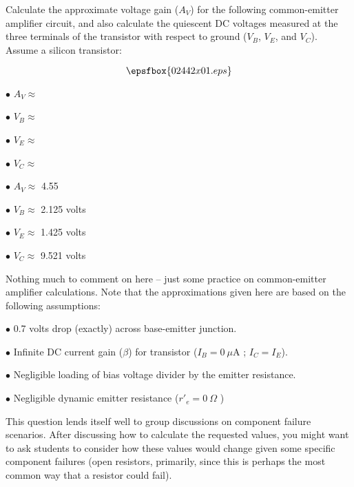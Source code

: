 

Calculate the approximate voltage gain ($A_V$) for the following common-emitter amplifier circuit, and also calculate the quiescent DC voltages measured at the three terminals of the transistor with respect to ground ($V_B$, $V_E$, and $V_C$).  Assume a silicon transistor:

$$\epsfbox{02442x01.eps}$$

\medskip
\goodbreak
\item{$\bullet$} $A_V \approx$ 
\item{$\bullet$} $V_B \approx$  
\item{$\bullet$} $V_E \approx$ 
\item{$\bullet$} $V_C \approx$ 
\medskip







\medskip
\goodbreak
\item{$\bullet$} $A_V \approx$ 4.55
\item{$\bullet$} $V_B \approx$ 2.125 volts
\item{$\bullet$} $V_E \approx$ 1.425 volts
\item{$\bullet$} $V_C \approx$ 9.521 volts
\medskip







Nothing much to comment on here -- just some practice on common-emitter amplifier calculations.  Note that the approximations given here are based on the following assumptions:

\medskip
\goodbreak
\item{$\bullet$} 0.7 volts drop (exactly) across base-emitter junction.
\item{$\bullet$} Infinite DC current gain ($\beta$) for transistor ($I_B = 0 \> \mu$A ; $I_C = I_E$).
\item{$\bullet$} Negligible loading of bias voltage divider by the emitter resistance.
\item{$\bullet$} Negligible dynamic emitter resistance ($r'_e = 0 \> \Omega$ )
\medskip

This question lends itself well to group discussions on component failure scenarios.  After discussing how to calculate the requested values, you might want to ask students to consider how these values would change given some specific component failures (open resistors, primarily, since this is perhaps the most common way that a resistor could fail).





